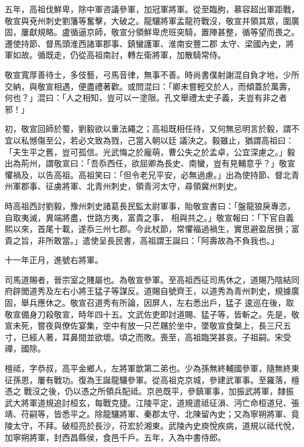 \begin{pinyinscope}
 五年，高祖伐鮮卑，除中軍咨議參軍，加冠軍將軍。從至臨朐，慕容超出軍距戰，敬宣與兗州刺史劉籓等奮擊，大破之。龍驤將軍孟龍符戰沒，敬宣并領其眾，圍廣固，屢獻規略。盧循逼京師，敬宣分領鮮卑虎班突騎，置陣甚整，循等望而畏之。遷使持節、督馬頭淮西諸軍郡事、鎮蠻護軍、淮南安豐二郡
 太守、梁國內史，將軍如故。循既走，仍從高祖南討，轉左衛將軍，加散騎常侍。



 敬宣寬厚善待士，多伎藝，弓馬音律，無事不善。時尚書僕射謝混自負才地，少所交納，與敬宣相遇，便盡禮著歡。或問混曰：「卿未嘗輕交於人，而傾蓋於萬壽，何也？」混曰：「人之相知，豈可以一塗限。孔文舉禮太史子義，夫豈有非之者邪！」



 初，敬宣回師於蜀，劉毅欲以重法繩之；高祖既相任待，又何無忌明言於毅，謂不宜以私憾傷至公，若必文致為戮，己當入朝以廷
 議決之。毅雖止，猶謂高祖曰：「夫生平之舊，豈可孤信。光武悔之於龐萌，曹公失之於孟卓，公宜深慮之。」毅出為荊州，謂敬宣曰：「吾忝西任，欲屈卿為長史、南蠻，豈有見輔意乎？」敬宣懼禍及，以告高祖。高祖笑曰：「但令老兄平安，必無過慮。」出為使持節、督北青州軍郡事、征虜將軍、北青州刺史，領青河太守，尋領冀州刺史。



 時高祖西討劉毅，豫州刺史諸葛長民監太尉軍事，貽敬宣書曰：「盤龍狼戾專恣，自取夷滅，異端將盡，世路方夷，富貴之事，
 相與共之。」敬宣報曰：「下官自義熙以來，首尾十載，遂忝三州七郡。今此杖節，常懼福過禍生，實思避盈居損；富貴之旨，非所敢當。」遣使呈長民書，高祖謂王誕曰：「阿壽故為不負我也。」



 十一年正月，進號右將軍。



 司馬道賜者，晉宗室之賤屬也。為敬宣參軍。至高祖西征司馬休之，道賜乃陰結同府辟閭道秀及左右小將王猛子等謀反。道賜自號齊王，以道秀為青州刺史，規據廣固，舉兵應休之。敬宣召道秀有所論，因屏人，左右悉出戶，猛子
 逡巡在後，取敬宣備身刀殺敬宣，時年四十五。文武佐吏即討道賜、猛子等，皆斬之。先是，敬宣未死，嘗夜與僚佐宴集，空中有放一只芒屩於坐中，墜敬宣食槃上，長三尺五寸，已經人著，耳鼻間並欲壞。頃之而敗。喪至，高祖臨哭甚哀。子祖嗣。宋受禪，國除。



 檀祗，字恭叔，高平金鄉人，左將軍歆第二弟也。少為孫無終輔國參軍，隨無終東征孫恩，屢有戰功。復為王誕龍驤參軍。從高祖克京城，參建武軍事。至羅落，檀憑之
 戰沒之後，仍以憑之所領兵配祗。京邑既平，參鎮軍事，加振武將軍，隸振武大將軍道規追討桓玄，每戰克捷。江陵平定，道規遣祗征溳、沔亡命桓道兒、張靖、苻嗣等，皆悉平之。除龍驤將軍、秦郡太守、北陳留內史；又為寧朔將軍、竟陵太守，不拜。破桓亮於長沙，苻宏於湘東。武陵內史庾悅疾病，道規以祗代悅，加寧朔將軍，封西昌縣侯，食邑千戶。五年，入為中書侍郎。




\end{pinyinscope}
